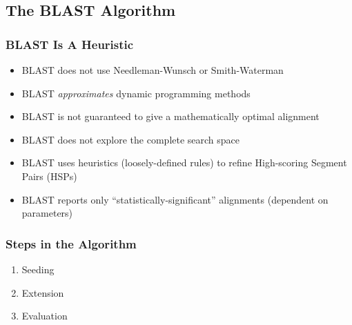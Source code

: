 %

\subsection{The BLAST Algorithm}
\begin{frame}
  \frametitle{BLAST Is A Heuristic}
  \begin{itemize}
    \item<1-> BLAST does not use Needleman-Wunsch or Smith-Waterman
    \item<1-> BLAST \emph{approximates} dynamic programming methods
    \item<1-> BLAST is not guaranteed to give a mathematically optimal alignment
    \item<2-> BLAST does not explore the complete search space
    \item<3-> BLAST uses heuristics (loosely-defined rules) to refine High-scoring Segment Pairs (HSPs)
    \item<4-> BLAST reports only ``statistically-significant'' alignments (dependent on parameters)
  \end{itemize}
\end{frame}

\begin{frame}
  \frametitle{Steps in the Algorithm}
  \begin{enumerate}
    \item Seeding
    \item Extension
    \item Evaluation
  \end{enumerate}
\end{frame}
